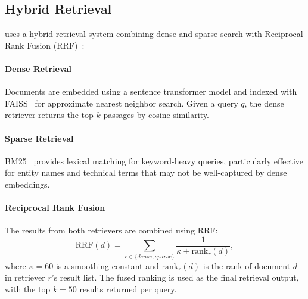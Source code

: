\subsection{Hybrid Retrieval}
\label{subsec:retrieval}

\ours{} uses a hybrid retrieval system combining dense and sparse search with Reciprocal Rank Fusion (RRF)~\cite{cormack2009rrf}:

\paragraph{Dense Retrieval}
Documents are embedded using a sentence transformer model and indexed with FAISS~\cite{johnson2019faiss} for approximate nearest neighbor search.
Given a query $q$, the dense retriever returns the top-$k$ passages by cosine similarity.

\paragraph{Sparse Retrieval}
BM25~\cite{robertson2009bm25} provides lexical matching for keyword-heavy queries, particularly effective for entity names and technical terms that may not be well-captured by dense embeddings.

\paragraph{Reciprocal Rank Fusion}
The results from both retrievers are combined using RRF:
\begin{equation}
    \text{RRF}(d) = \sum_{r \in \{dense, sparse\}} \frac{1}{\kappa + \text{rank}_r(d)},
    \label{eq:rrf}
\end{equation}
where $\kappa = 60$ is a smoothing constant and $\text{rank}_r(d)$ is the rank of document $d$ in retriever $r$'s result list.
The fused ranking is used as the final retrieval output, with the top $k = 50$ results returned per query.
